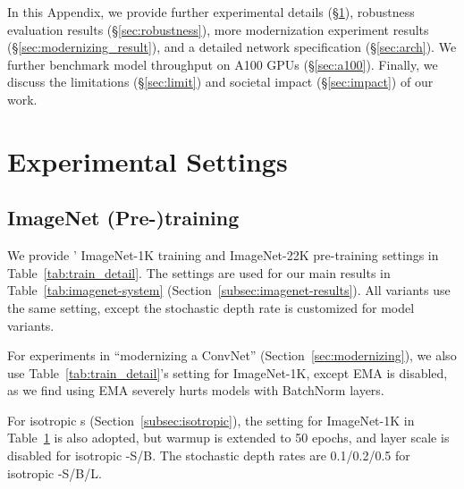 In this Appendix, we provide further experimental details (\S \ref{sec:setting}), robustness evaluation results (\S \ref{sec:robustness}), more modernization experiment results (\S\ref{sec:modernizing_result}), and a detailed network specification (\S \ref{sec:arch}). We further benchmark model throughput on A100 GPUs (\S \ref{sec:a100}). Finally, we discuss the limitations (\S \ref{sec:limit}) and societal impact (\S \ref{sec:impact}) of our work.



\section{Experimental Settings}
\label{sec:setting}
\subsection{ImageNet (Pre-)training} 
\label{subsec:setting}
We provide ' ImageNet-1K training and ImageNet-22K pre-training settings in Table~\ref{tab:train_detail}. The settings are used for our main results in Table~\ref{tab:imagenet-system} (Section~\ref{subsec:imagenet-results}).  All \cnn{} variants use the same setting, except the stochastic depth rate is customized for model variants. 

For experiments in ``modernizing a ConvNet'' (Section~\ref{sec:modernizing}), we also use Table~\ref{tab:train_detail}'s setting for ImageNet-1K, except EMA is disabled, as we find using EMA severely hurts models with BatchNorm layers.

For isotropic \cnn{}s (Section~\ref{subsec:isotropic}), the setting for ImageNet-1K in Table~\ref{sec:setting} is also adopted, but warmup is extended to 50 epochs, and layer scale is disabled for isotropic \cnn{}-S/B. The stochastic depth rates are 0.1/0.2/0.5 for isotropic \cnn{}-S/B/L.

